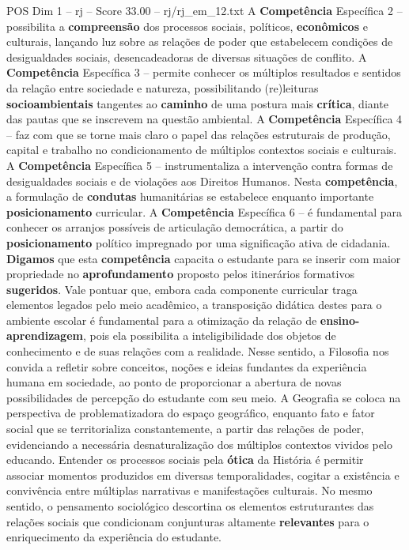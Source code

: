 \begin{textsample}{POS Dim 1 – rj – Score 33.00 – rj/rj\_em\_12.txt}
A \textbf{Competência} Específica 2 – possibilita a \textbf{compreensão} dos processos sociais, políticos, \textbf{econômicos} e culturais, lançando luz sobre as relações de poder que estabelecem condições de desigualdades sociais, desencadeadoras de diversas situações de conflito.
A \textbf{Competência} Específica 3 – permite conhecer os múltiplos resultados e sentidos da relação entre sociedade e natureza, possibilitando (re)leituras \textbf{socioambientais} tangentes ao \textbf{caminho} de uma postura mais \textbf{crítica}, diante das pautas que se inscrevem na questão ambiental.
A \textbf{Competência} Específica 4 – faz com que se torne mais claro o papel das relações estruturais de produção, capital e trabalho no condicionamento de múltiplos contextos sociais e culturais.
A \textbf{Competência} Específica 5 – instrumentaliza a intervenção contra formas de desigualdades sociais e de violações aos Direitos Humanos.
Nesta \textbf{competência}, a formulação de \textbf{condutas} humanitárias se estabelece enquanto importante \textbf{posicionamento} curricular.
A \textbf{Competência} Específica 6 – é fundamental para conhecer os arranjos possíveis de articulação democrática, a partir do \textbf{posicionamento} político impregnado por uma significação ativa de cidadania. \textbf{Digamos} que esta \textbf{competência} capacita o estudante para se inserir com maior propriedade no \textbf{aprofundamento} proposto pelos itinerários formativos \textbf{sugeridos}.
Vale pontuar que, embora cada componente curricular traga elementos legados pelo meio acadêmico, a transposição didática destes para o ambiente escolar é fundamental para a otimização da relação de \textbf{ensino-aprendizagem}, pois ela possibilita a inteligibilidade dos objetos de conhecimento e de suas relações com a realidade.
Nesse sentido, a Filosofia nos convida a refletir sobre conceitos, noções e ideias fundantes da experiência humana em sociedade, ao ponto de proporcionar a abertura de novas possibilidades de percepção do estudante com seu meio.
A Geografia se coloca na perspectiva de problematizadora do espaço geográfico, enquanto fato e fator social que se territorializa constantemente, a partir das relações de poder, evidenciando a necessária desnaturalização dos múltiplos contextos vividos pelo educando.
Entender os processos sociais pela \textbf{ótica} da História é permitir associar momentos produzidos em diversas temporalidades, cogitar a existência e convivência entre múltiplas narrativas e manifestações culturais.
No mesmo sentido, o pensamento sociológico descortina os elementos estruturantes das relações sociais que condicionam conjunturas altamente \textbf{relevantes} para o enriquecimento da experiência do estudante.

\end{textsample}
